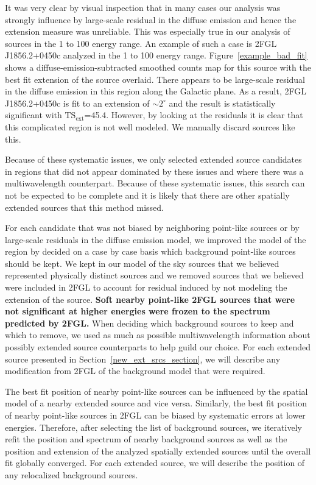 \documentclass[12pt,preprint]{aastex}
\newcommand{\gev}{\text{GeV}\xspace}
\newcommand{\tsext}{{\ensuremath{\text{TS}_{\text{ext}}}}\xspace}
\newcommand{\degree}{^\circ\xspace}
\newcommand{\newtext}[1]{{\bfseries \color{red}#1}}
\begin{document}
It was very clear by visual inspection that in many
cases our analysis was strongly influence by large-scale residual in the
diffuse emission and hence the extension measure was unreliable.  This was
especially true in our analysis of sources in the 1 \gev to 100 \gev
energy range.  An example of such a case is 2FGL\,J1856.2+0450c analyzed
in the 1 \gev to 100 \gev energy range. Figure~\ref{example_bad_fit}
shows a diffuse-emission-subtracted smoothed counts map for
this source with the best
fit extension of the source overlaid. There appears to be large-scale
residual in the diffuse emission in this region along the Galactic plane.
As a result, 2FGL\,J1856.2+0450c is fit to an extension of $\sim2\degree$
and the result is statistically significant with \tsext=45.4. However,
by looking at the residuals it is clear that this complicated region is
not well modeled. We manually discard sources like this.

Because of these systematic issues, we only selected extended source
candidates in regions that did not appear dominated by these issues and
where there was a multiwavelength
counterpart. Because of these systematic issues, this search can not be
expected to be complete and it is likely that there are other spatially
extended sources that this method missed.

For each candidate that was not biased by neighboring point-like
sources or by large-scale residuals in the diffuse emission model, we
improved the model of the region by decided on a case by case basis which
background point-like sources should be kept.  We kept in our model of the sky
sources that we
believed represented physically distinct sources and we removed 
sources that we believed were included in 2FGL to account
for residual induced by not modeling the extension of the source.
\newtext{
Soft nearby point-like 2FGL sources that were not significant at higher energies
were frozen to the spectrum predicted by 2FGL.
}
When deciding
which background sources to keep and which to remove, we used as much as possible
multiwavelength information about possibly extended source counterparts
to help guild our choice. For each extended source presented in 
Section~\ref{new_ext_srcs_section}, we will describe any modification from 2FGL
of the background model that were required.

The best fit position of nearby point-like sources can be influenced by
the spatial model of a nearby extended source and vice versa.  Similarly,
the best fit position of nearby point-like sources in 2FGL can be biased
by systematic errors at lower energies.
Therefore, after selecting the list of background sources, we iteratively
refit the position and spectrum of nearby background sources as well as
the position and extension of the analyzed spatially extended
sources until the overall fit globally converged.  For each extended
source, we will describe the position of any relocalized background
sources.
\end{document}
